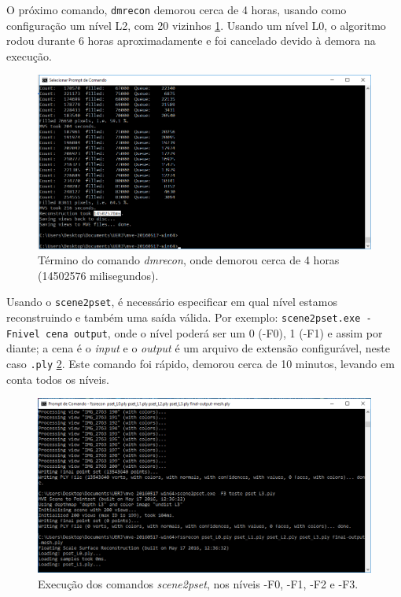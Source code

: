 O próximo comando, \texttt{dmrecon} demorou cerca de 4 horas, usando como
configuração um nível L2, com 20 vizinhos \ref{fig:MVEDenseRecon}.  Usando um
nível L0, o algoritmo rodou durante 6 horas aproximadamente e foi cancelado
devido à demora na execução. 

\begin{figure}[!h]
	\centering
	\includegraphics[width=0.8\linewidth]{figs/umvetempo.png}
	\caption{%
	Término do comando \emph{dmrecon}, onde demorou cerca de 4 horas (14502576 milisegundos).
	}\label{fig:MVEDenseRecon}
\end{figure} 

Usando o \texttt{scene2pset}, é necessário especificar em qual nível estamos
reconstruindo e também uma saída válida. Por exemplo: \texttt{scene2pset.exe -Fnivel
cena output}, onde o nível poderá ser um 0 (-F0), 1 (-F1) e assim por diante; a
cena é o \emph{input} e o \emph{output} é um arquivo de extensão configurável,
neste caso \texttt{.ply} \ref{fig:MVEscene2pset}. Este comando foi rápido, demorou
cerca de 10 minutos, levando em conta todos os níveis.

\begin{figure}[!h]
	\centering
	\includegraphics[width=0.8\linewidth]{figs/mvemesh.png}
	\caption{%
	Execução dos comandos \emph{scene2pset}, nos níveis -F0, -F1, -F2 e -F3.
	}\label{fig:MVEscene2pset}
\end{figure} 


